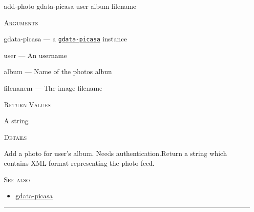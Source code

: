 \documentclass[a4paper]{report}
\begin{document}
    \label{cl-gdata-picasa__fun__add-photo}
    \begin{defun}[Function]
    add-photo gdata-picasa user album filename


    
    \bigskip
    \textsc{Arguments}

gdata-picasa
	--- a \hyperref[cl-gdata-picasa__class__gdata-picasa]{\texttt{gdata-picasa}}
   instance

user
	--- An username

album
	--- Name of the photos albun

filenanem
	--- The image filename




    
    \bigskip
    \textsc{Return Values}

A string


	
    \bigskip
    \textsc{Details}

Add a photo for user's album. Needs authentication.Return a string which contains XML format representing the photo feed.


      
    \bigskip
    \textsc{See also}


	
    \begin{itemize}
    
	  
    \item
    \hyperref[cl-gdata-picasa__class__gdata-picasa]{gdata-picasa}
    
	
    \end{itemize}
  
      


    
    \end{defun}
  
  

    \rule{\linewidth}{0.1mm}
    
\end{document}

